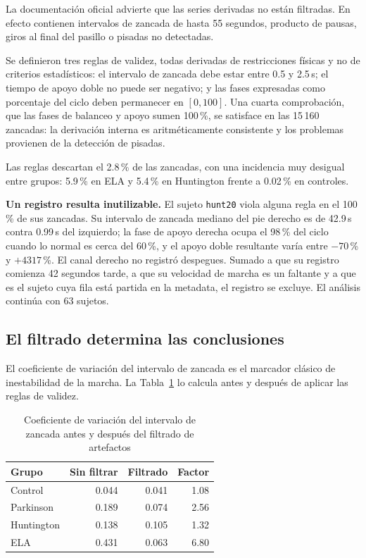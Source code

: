\documentclass[conference]{IEEEtran}
\begin{document}
La documentación oficial advierte que las series derivadas no están filtradas. En efecto contienen intervalos de zancada de hasta 55 segundos, producto de pausas, giros al final del pasillo o pisadas no detectadas.

Se definieron tres reglas de validez, todas derivadas de restricciones físicas y no de criterios estadísticos: el intervalo de zancada debe estar entre 0.5 y 2.5\,s; el tiempo de apoyo doble no puede ser negativo; y las fases expresadas como porcentaje del ciclo deben permanecer en $[0, 100]$. Una cuarta comprobación, que las fases de balanceo y apoyo sumen 100\,\%, se satisface en las 15\,160 zancadas: la derivación interna es aritméticamente consistente y los problemas provienen de la detección de pisadas.

Las reglas descartan el 2.8\,\% de las zancadas, con una incidencia muy desigual entre grupos: 5.9\,\% en ELA y 5.4\,\% en Huntington frente a 0.02\,\% en controles.

\textbf{Un registro resulta inutilizable.} El sujeto \texttt{hunt20} viola alguna regla en el 100\,\% de sus zancadas. Su intervalo de zancada mediano del pie derecho es de 42.9\,s contra 0.99\,s del izquierdo; la fase de apoyo derecha ocupa el 98\,\% del ciclo cuando lo normal es cerca del 60\,\%, y el apoyo doble resultante varía entre $-70$\,\% y $+4317$\,\%. El canal derecho no registró despegues. Sumado a que su registro comienza 42 segundos tarde, a que su velocidad de marcha es un faltante y a que es el sujeto cuya fila está partida en la metadata, el registro se excluye. El análisis continúa con 63 sujetos.

\subsection{El filtrado determina las conclusiones}

El coeficiente de variación del intervalo de zancada es el marcador clásico de inestabilidad de la marcha. La Tabla~\ref{tab:filtrado} lo calcula antes y después de aplicar las reglas de validez.

\begin{table}[t]
\caption{Coeficiente de variación del intervalo de zancada antes y después del filtrado de artefactos}
\label{tab:filtrado}
\centering
\begin{tabular}{lrrr}
\toprule
Grupo & Sin filtrar & Filtrado & Factor \\
\midrule
Control    & 0.044 & 0.041 & 1.08 \\
Parkinson  & 0.189 & 0.074 & 2.56 \\
Huntington & 0.138 & 0.105 & 1.32 \\
ELA        & 0.431 & 0.063 & 6.80 \\
\bottomrule
\end{tabular}
\end{table}
\end{document}
